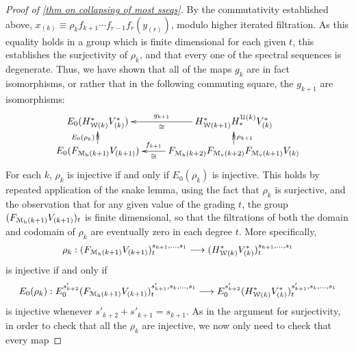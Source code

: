 \documentclass[11pt]{amsart}
\theoremstyle{plain}
\theoremstyle{definition}
\renewcommand{\to}{\longrightarrow}
\newcommand{\calW}{\mathcal{W}}
\newcommand{\calU}{\mathcal{U}}
\newcommand{\calM}{\mathcal{M}}
\newcommand{\calMv}{\mathcal{M}_\textup{v}}
\theoremstyle{plain}
\newcommand{\UEAX}{\overline{X}'}%
\begin{document}
\begin{Calculations of HWn for n nonzero}
\begin{proof}[Proof of \ref{thm on collapsing of most sseqs}]
By the commutativity established above, $x_{(k)}\equiv\rho_{k}f_{k+1}\cdots f_{r-1}f_r(y_{(r)})$, modulo higher iterated filtration. As this equality holds in a group which is finite dimensional for each given $t$, this establishes the surjectivity of $\rho_k$, and that
%
%
%
every one of the spectral sequences is degenerate. Thus, we have shown that all of the maps $g_k$ are in fact isomorphisms, or rather that in the following commuting square, the $g_{k+1}$ are isomorphisms:
\[\xymatrix@R=4mm{
E_{0}(H^*_{\calW(k)}V^*_{(k)})
&H^*_{\calW(k+1)}H_*^{\calU(k)}V^*_{(k)}\ar@{->}[l]^-{\cong}_-{{g}_{k+1}}
\\
E_0(F_{\calM_{\textup{h}}(k+1)}V_{(k+1)})\ar@{->>}[u]^-{E_0(\rho_k)}
&F_{\calM_{\textup{h}}(k+2)}F_{\calM_{\textup{v}}(k+2)}F_{\calMv(k+1)}V_{(k)}\ar@{->}[l]^-{\cong}_-{{f}_{k+1}}\ar@{->>}[u]_-{\rho_{k+1}}
}\]
For each $k$, $\rho_k$ is injective if and only if $E_0(\rho_k)$ is injective. This holds by repeated application of the snake lemma, using the fact that $\rho_k$ is surjective, and the observation that for any given value of the grading $t$, the group $(F_{\calM_{\textup{h}}(k+1)}V_{(k+1)})_t$ is finite dimensional, so that the filtrations of both the domain and codomain of $\rho_k$ are eventually zero in each degree $t$. More specifically,
\[\rho_k:(F_{\calM_{\textup{h}}(k+1)}V_{(k+1)})_t^{s_{k+1},\ldots,s_1}\to (H^*_{\calW(k)}V^*_{(k)})_t^{s_{k+1},\ldots,s_1}\]
is injective if and only if
\[E_0(\rho_k):E_0^{s'_{k+2}}(F_{\calM_{\textup{h}}(k+1)}V_{(k+1)})_t^{s'_{k+1},s_k,\ldots,s_1}\to E_0^{s'_{k+2}}(H^*_{\calW(k)}V^*_{(k)})_t^{s'_{k+1},s_k,\ldots,s_1}\]
is injective whenever $s'_{k+2}+s'_{k+1}=s_{k+1}$. As in the argument for surjectivity, in order to check that all the $\rho_k$ are injective, we now only need to check that every map

\end{proof}
\end{Calculations of HWn for n nonzero}
\end{document}
